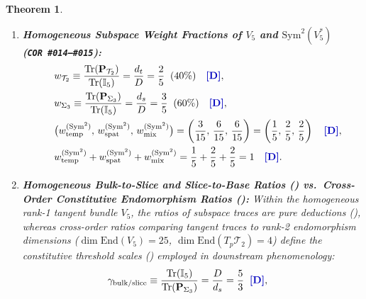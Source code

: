 \documentclass[11pt,a4paper]{article}
\newcommand{\catD}{\text{\textbf{\textcolor{blue!75!black}{[D]}}}}
\newcommand{\catH}{\text{\textbf{\textcolor{orange!80!black}{[H]}}}}
\theoremstyle{definition}
\theoremstyle{plain}
\newtheorem{theorem}[axiom]{Theorem}
\theoremstyle{remark}
\begin{document}
\begin{theorem}
\begin{enumerate}[label=(\roman*)]
\begin{align}
  \dim\mathrm{End}\!\left(T_p\Sigma_3\right) &= d_s^2 = 9, \nonumber \\[3pt]
  \mathrm{Tr}(\mathcal{P}_+) &= d_t^2 + d_s^2 = 4 + 9 = 13_+, &
  \mathrm{Tr}(\mathcal{P}_-) &= 2\,d_t d_s = 12_-, \nonumber \\[3pt]
  \dim\mathrm{End}\!\left(V_5\right) &= 13_+ + 12_- = D^2 = 25, &
  \mathrm{Tr}(\mathcal{A}_{\mathbf{F}}) &= 13 - 12 = (\mathrm{Tr}\,\mathbf{F})^2 = +1 \;\;\catD. \label{eq:c1_fundamental_traces}
  \end{align}
  \item \textbf{Homogeneous Subspace Weight Fractions of $V_5$ and $\mathrm{Sym}^2(V_5^*)$ (\texttt{COR~\#014--\#015}):}
  \begin{equation}
    \label{eq:c1_subspace_weights}
    \begin{aligned}
    &\quad w_{\mathcal{T}_2} \equiv \frac{\mathrm{Tr}(\mathbf{P}_{\mathcal{T}_2})}{\mathrm{Tr}(\mathbb{I}_5)} = \frac{d_t}{D} = \frac{2}{5} \;\; (40\%) \quad \catD, \\
    &\quad w_{\Sigma_3} \equiv \frac{\mathrm{Tr}(\mathbf{P}_{\Sigma_3})}{\mathrm{Tr}(\mathbb{I}_5)} = \frac{d_s}{D} = \frac{3}{5} \;\; (60\%) \quad \catD, \\
    &\quad \bigl(w_{\mathrm{temp}}^{(\mathrm{Sym}^2)},\, w_{\mathrm{spat}}^{(\mathrm{Sym}^2)},\, w_{\mathrm{mix}}^{(\mathrm{Sym}^2)}\bigr) = \left(\frac{3}{15},\, \frac{6}{15},\, \frac{6}{15}\right) = \left(\frac{1}{5},\, \frac{2}{5},\, \frac{2}{5}\right) \quad \catD, \\
    &\quad w_{\mathrm{temp}}^{(\mathrm{Sym}^2)} + w_{\mathrm{spat}}^{(\mathrm{Sym}^2)} + w_{\mathrm{mix}}^{(\mathrm{Sym}^2)} = \frac{1}{5} + \frac{2}{5} + \frac{2}{5} = 1 \quad \catD.
    \end{aligned}
  \end{equation}
  \item \textbf{Homogeneous Bulk-to-Slice and Slice-to-Base Ratios (\catD) vs.\ Cross-Order Constitutive Endomorphism Ratios (\catH):}
  Within the homogeneous rank-1 tangent bundle $V_5$, the ratios of subspace traces are pure deductions (\catD), whereas cross-order ratios comparing tangent traces to rank-2 endomorphism dimensions ($\dim\mathrm{End}(V_5)=25$, $\dim\mathrm{End}(T_p\mathcal{T}_2)=4$) define the constitutive threshold scales (\catH) employed in downstream phenomenology:
  \begin{align}
  \gamma_{\mathrm{bulk/slice}} &\equiv \frac{\mathrm{Tr}(\mathbb{I}_5)}{\mathrm{Tr}(\mathbf{P}_{\Sigma_3})} = \frac{D}{d_s} = \frac{5}{3} \;\;\catD, &

\end{align}
\end{enumerate}
\end{theorem}
\end{document}
